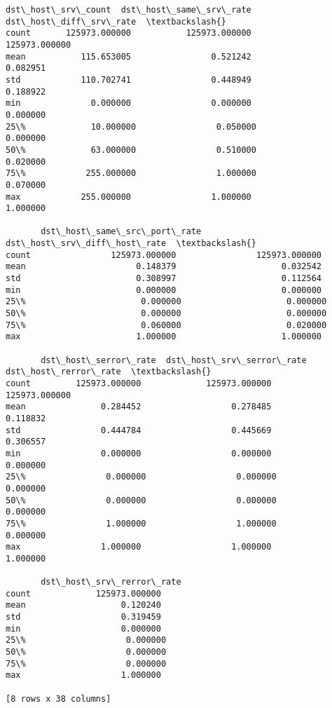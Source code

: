 \documentclass[11pt]{article}
\begin{document}
\begin{tcolorbox}[breakable, size=fbox, boxrule=.5pt, pad at break*=1mm, opacityfill=0]
\begin{Verbatim}[commandchars=\\\{\}]
       dst\_host\_srv\_count  dst\_host\_same\_srv\_rate  dst\_host\_diff\_srv\_rate  \textbackslash{}
count       125973.000000           125973.000000           125973.000000
mean           115.653005                0.521242                0.082951
std            110.702741                0.448949                0.188922
min              0.000000                0.000000                0.000000
25\%             10.000000                0.050000                0.000000
50\%             63.000000                0.510000                0.020000
75\%            255.000000                1.000000                0.070000
max            255.000000                1.000000                1.000000

       dst\_host\_same\_src\_port\_rate  dst\_host\_srv\_diff\_host\_rate  \textbackslash{}
count                125973.000000                125973.000000
mean                      0.148379                     0.032542
std                       0.308997                     0.112564
min                       0.000000                     0.000000
25\%                       0.000000                     0.000000
50\%                       0.000000                     0.000000
75\%                       0.060000                     0.020000
max                       1.000000                     1.000000

       dst\_host\_serror\_rate  dst\_host\_srv\_serror\_rate  dst\_host\_rerror\_rate  \textbackslash{}
count         125973.000000             125973.000000         125973.000000
mean               0.284452                  0.278485              0.118832
std                0.444784                  0.445669              0.306557
min                0.000000                  0.000000              0.000000
25\%                0.000000                  0.000000              0.000000
50\%                0.000000                  0.000000              0.000000
75\%                1.000000                  1.000000              0.000000
max                1.000000                  1.000000              1.000000

       dst\_host\_srv\_rerror\_rate
count             125973.000000
mean                   0.120240
std                    0.319459
min                    0.000000
25\%                    0.000000
50\%                    0.000000
75\%                    0.000000
max                    1.000000

[8 rows x 38 columns]
\end{Verbatim}
\end{tcolorbox}
        
\end{document}
